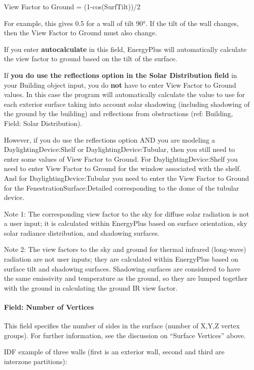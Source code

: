 View Factor to Ground = (1-cos(SurfTilt))/2

For example, this gives 0.5 for a wall of tilt 90°. If the tilt of the wall changes, then the View Factor to Ground must also change.

If you enter \textbf{autocalculate} in this field, EnergyPlus will automatically calculate the view factor to ground based on the tilt of the surface.

If \textbf{you do use the reflections option in the Solar Distribution field} in your Building object input, you do \textbf{not} have to enter View Factor to Ground values. In this case the program will automatically calculate the value to use for each exterior surface taking into account solar shadowing (including shadowing of the ground by the building) and reflections from obstructions (ref: Building, Field: Solar Distribution).

However, if you do use the reflections option AND you are modeling a DaylightingDevice:Shelf or DaylightingDevice:Tubular, then you still need to enter some values of View Factor to Ground. For DaylightingDevice:Shelf you need to enter View Factor to Ground for the window associated with the shelf. And for DaylightingDevice:Tubular you need to enter the View Factor to Ground for the FenestrationSurface:Detailed corresponding to the dome of the tubular device.

Note 1: The corresponding view factor to the sky for diffuse solar radiation is not a user input; it is calculated within EnergyPlus based on surface orientation, sky solar radiance distribution, and shadowing surfaces.

Note 2: The view factors to the sky and ground for thermal infrared (long-wave) radiation are not user inputs; they are calculated within EnergyPlus based on surface tilt and shadowing surfaces. Shadowing surfaces are considered to have the same emissivity and temperature as the ground, so they are lumped together with the ground in calculating the ground IR view factor.

\paragraph{Field: Number of Vertices}\label{field-number-of-vertices-3}

This field specifies the number of sides in the surface (number of X,Y,Z vertex groups). For further information, see the discussion on ``Surface Vertices'' above.

IDF example of three walls (first is an exterior wall, second and third are interzone partitions):

